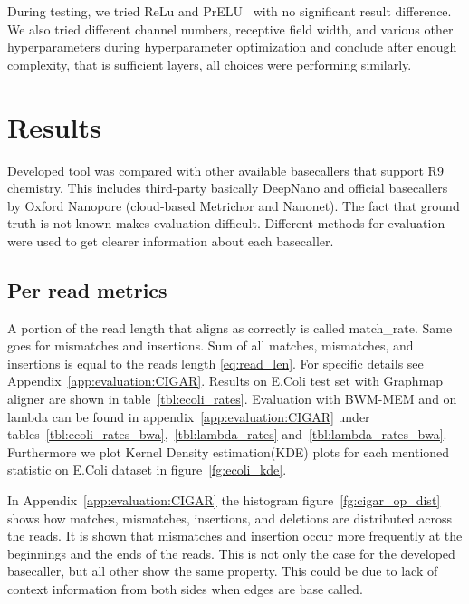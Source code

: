 \documentclass[runningheads,a4paper]{llncs}
\begin{document}
During testing, we tried ReLu and PrELU~\cite{prelu} with no significant result difference. We also tried different channel numbers, receptive field width, and various other hyperparameters during hyperparameter optimization and conclude after enough complexity, that is sufficient layers, all choices were performing similarly.

\section{Results}

Developed tool was compared with other available basecallers that support R9 chemistry. This includes third-party basically DeepNano and official basecallers by Oxford Nanopore (cloud-based Metrichor and Nanonet).
The fact that ground truth is not known makes evaluation difficult.
Different methods for evaluation were used to get clearer information about each basecaller.

\subsection{Per read metrics}
\label{subs:read_metrics}
A portion of the read length that aligns as correctly is called match\_rate. Same goes for mismatches and insertions.
Sum of all matches, mismatches, and insertions is equal to the reads length \ref{eq:read_len}. For specific details see Appendix~\ref{app:evaluation:CIGAR}. Results on E.Coli test set with Graphmap aligner are shown in table~\ref{tbl:ecoli_rates}. Evaluation with BWM-MEM and on lambda can be found in appendix~\ref{app:evaluation:CIGAR} under tables~\ref{tbl:ecoli_rates_bwa},~\ref{tbl:lambda_rates} and~\ref{tbl:lambda_rates_bwa}. Furthermore we plot Kernel Density estimation(KDE) plots for each mentioned statistic on E.Coli dataset in figure~\ref{fg:ecoli_kde}.

In Appendix~\ref{app:evaluation:CIGAR} the histogram figure~\ref{fg:cigar_op_dist} shows how matches, mismatches, insertions, and deletions are distributed across the reads. It is shown that mismatches and insertion occur more frequently at the beginnings and the ends of the reads. This is not only the case for the developed basecaller, but all other show the same property. This could be due to lack of context information from both sides when edges are base called.
\end{document}
